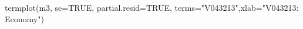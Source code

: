 \begin{Schunk}
\begin{Sinput}
 termplot(m3, se=TRUE, partial.resid=TRUE, terms="V043213",xlab="V043213: Economy")
\end{Sinput}
\end{Schunk}
